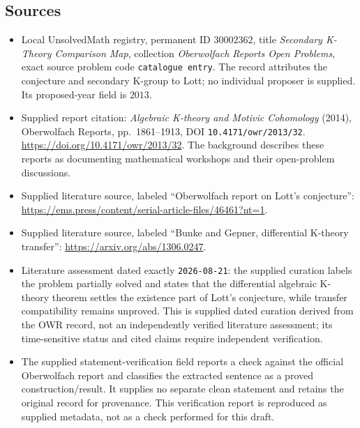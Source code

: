 \documentclass[11pt]{article}
\begin{document}
\subsection{Sources}
\begin{itemize}
\item Local UnsolvedMath registry, permanent ID \(30002362\), title \emph{Secondary K-Theory Comparison Map}, collection \emph{Oberwolfach Reports Open Problems}, exact source problem code \texttt{catalogue entry}. The record attributes the conjecture and secondary K-group to Lott; no individual proposer is supplied. Its proposed-year field is \(2013\).
\item Supplied report citation: \emph{Algebraic K-theory and Motivic Cohomology} (2014), Oberwolfach Reports, pp.\ 1861--1913, DOI \texttt{10.4171/owr/2013/32}. \url{https://doi.org/10.4171/owr/2013/32}. The background describes these reports as documenting mathematical workshops and their open-problem discussions.
\item Supplied literature source, labeled ``Oberwolfach report on Lott's conjecture'': \url{https://ems.press/content/serial-article-files/46461?nt=1}.
\item Supplied literature source, labeled ``Bunke and Gepner, differential K-theory transfer'': \url{https://arxiv.org/abs/1306.0247}.
\item Literature assessment dated exactly \texttt{2026-08-21}: the supplied curation labels the problem partially solved and states that the differential algebraic K-theory theorem settles the existence part of Lott's conjecture, while transfer compatibility remains unproved. This is supplied dated curation derived from the OWR record, not an independently verified literature assessment; its time-sensitive status and cited claims require independent verification.
\item The supplied statement-verification field reports a check against the official Oberwolfach report and classifies the extracted sentence as a proved construction/result. It supplies no separate clean statement and retains the original record for provenance. This verification report is reproduced as supplied metadata, not as a check performed for this draft.
\end{itemize}
\end{document}
